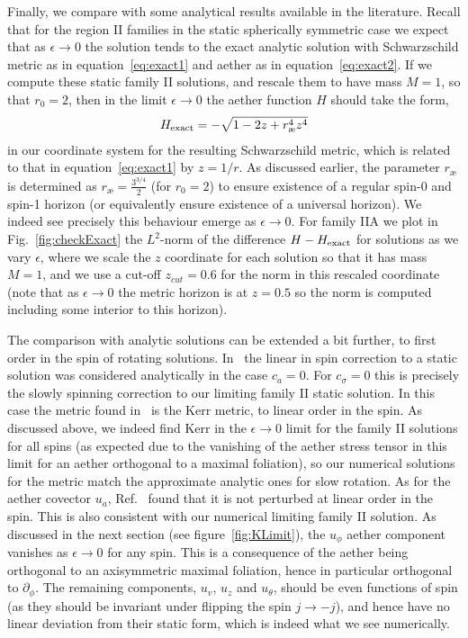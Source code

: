 \documentclass[12pt]{article}
\numberwithin{equation}{section}
\begin{document}
Finally, we compare with some analytical results available in the literature. Recall that for the region II families in the static spherically symmetric case we expect that as $\epsilon \to 0$ the solution tends to the exact analytic solution with Schwarzschild metric as in equation~\eqref{eq:exact1} and aether as in equation~\eqref{eq:exact2}.
If we compute these static family II solutions, and rescale them to have mass $M = 1$, so that $r_0 = 2$, then in the limit $\epsilon \to 0$ the aether function $H$ should take the form,
\begin{eqnarray}
H_{\rm exact} = - \sqrt{1 - 2 z + r^4_{\text{\ae}} z^4 }
\end{eqnarray}
in our coordinate system for the resulting  Schwarzschild metric, which is
related to that in  
equation~\eqref{eq:exact1} by $z = 1/r$. As discussed earlier, the parameter $r_{\text{\ae}}$ is determined as $r_{\text{\ae}} = \frac{3^{3/4}}{2}$ (for $r_0 = 2$) to ensure existence of a regular spin-0 and spin-1 horizon (or equivalently ensure existence of a universal horizon). 
We indeed see precisely this behaviour emerge as $\epsilon \to 0$. For family IIA we plot in Fig.~\ref{fig:checkExact} the $L^2$-norm of the difference $H - H_{\rm exact}$ for solutions as we vary $\epsilon$, where we scale the $z$ coordinate for each solution so that it has mass $M = 1$, and we use a cut-off $z_{cut} = 0.6$ for the norm in this rescaled coordinate (note that as $\epsilon \to 0$ the metric horizon is at $z = 0.5$ so the norm is computed including some interior to this horizon).

The comparison with analytic solutions can be extended a bit
further, to first order in the spin of rotating solutions. In~\cite{Barausse:2015frm} the linear in spin correction to a static solution was considered analytically in the case $c_a = 0$. For $c_\sigma = 0$ this is precisely the slowly spinning correction to our limiting family II static solution. In this case the metric found in~\cite{Barausse:2015frm} is the Kerr metric, to linear order in the spin. As discussed above, we indeed find Kerr in the $\epsilon \to 0$ limit for the family II solutions for all spins
(as expected due to the vanishing of the aether stress tensor in this limit for an aether orthogonal to a maximal foliation), so our numerical solutions for the metric match the approximate analytic ones for slow rotation.  As for the aether covector $u_a$, Ref.~\cite{Barausse:2015frm} found that it is not perturbed at linear order in the spin. This is also consistent with our numerical limiting family II solution. As discussed in the next section (see figure~\ref{fig:KLimit}), the $u_\phi$ aether component vanishes as $\epsilon \to 0$ for any spin. 
This is a consequence of the aether being orthogonal to an axisymmetric
maximal foliation, hence in particular orthogonal to $\partial_\phi$.
The remaining components, $u_v$, $u_z$ and $u_\theta$,  should be even functions of spin (as they should be invariant under flipping the spin $j \to -j$), and hence have no linear deviation from their static form, which is indeed what we see numerically.
\end{document}
